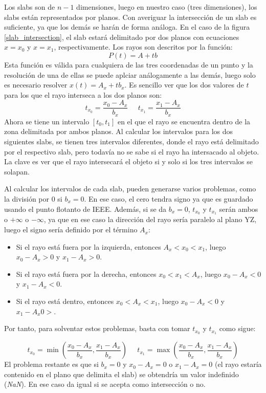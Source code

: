
Los slabs son de $n-1$ dimensiones, luego en nuestro caso (tres dimensiones), los slabs están representados por planos. Con averiguar la intersección de un slab es suficiente, ya que los demás se harán de forma análoga. En el caso de la figura \ref{slab_intersection}, el slab estará delimitado por dos planos con ecuaciones $x=x_0$ y $x=x_1$, respectivamente. Los rayos son descritos por la función:
\[
P(t)=A+tb
\]
Esta función es válida para cualquiera de las tres coordenadas de un punto y la resolución de una de ellas se puede aplciar análogamente a las demás, luego solo es necesario resolver $x(t)=A_x+tb_x$. Es sencillo ver que los dos valores de $t$ para los que el rayo interseca a los dos planos son:
\[
t_{x_0}=\frac{x_0-A_x}{b_x} \;\;\;\;\; t_{x_1}=\frac{x_1-A_x}{b_x}
\]
Ahora se tiene un intervalo $[t_0,t_1]$ en el que el rayo se encuentra dentro de la zona delimitada por ambos planos. Al calcular los intervalos para los dos siguientes slabs, se tienen tres intervalos diferentes, donde el rayo está delimitado por el respectivo slab, pero todavía no se sabe si el rayo ha intersacado al objeto. La clave es ver que el rayo intersecará el objeto si y solo si los tres intervalos se solapan.

Al calcular los intervalos de cada slab, pueden generarse varios problemas, como la división por 0 si $b_x=0$. En ese caso, el cero tendra signo ya que es guardado usando el punto flotanto de IEEE. Además, si se da $b_x=0$, $t_{x_0}$ y $t_{x_1}$ serán ambos o $+\infty$ o $-\infty$, ya que en ese caso la dirección del rayo sería paralelo al plano YZ, luego el signo sería definido por el término $A_x$:

\begin{itemize}
\item Si el rayo está fuera por la izquierda, entonces $A_x<x_0<x_1$, luego $x_0-A_x>0$ y $x_1-A_x>0$.
\item Si el rayo está fuera por la derecha, entonces $x_0<x_1<A_x$, luego $x_0-A_x<0$ y $x_1-A_x<0$.
\item Si el rayo está dentro, entonces $x_0<A_x<x_1$, luego $x_0-A_x<0$ y $x_1-A_x0>$.
\end{itemize}

Por tanto, para solventar estos problemas, basta con tomar $t_{x_0}$ y $t_{x_1}$ como sigue:

\[
t_{x_0}=\min\left(\frac{x_0-A_x}{b_x},\frac{x_1-A_x}{b_x}\right) \;\;\;\;\;t_{x_1}=\max\left(\frac{x_0-A_x}{b_x},\frac{x_1-A_x}{b_x}\right)
\]
El problema restante es que si $b_x=0$ y $x_0-A_x=0$ o $x_1-A_x=0$ (el rayo estaría contenido en el plano que delimita el slab) se obtendría un valor indefinido (\textit{NaN}). En ese caso da igual si se acepta como intersección o no.

